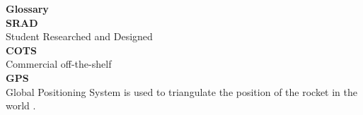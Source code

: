 {\fontsize{14}{14}\selectfont \textbf{Glossary}}\\

\textbf{SRAD}\\
Student Researched and Designed\\

\textbf{COTS}\\
Commercial off-the-shelf\\

\textbf{GPS}\\
Global Positioning System is used to triangulate the position of the rocket in the world \cite{GPS}.\\
